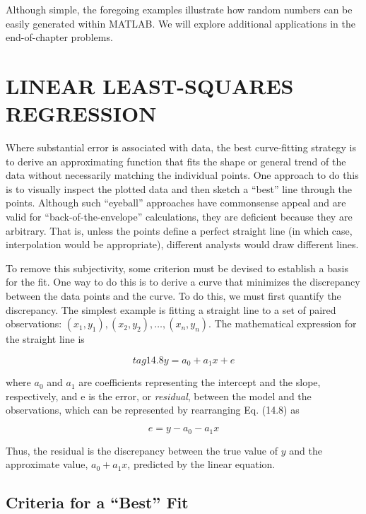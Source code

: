 \documentclass[../main.tex]{subfiles}
\begin{document}
Although simple, the foregoing examples illustrate how random numbers can be easily generated within MATLAB. We will explore additional applications in the end-of-chapter problems.

\label{cha:cha_P_14_3}
\section{LINEAR LEAST-SQUARES REGRESSION}

\noindent Where substantial error is associated with data, the best curve-fitting strategy is to derive
an approximating function that fits the shape or general trend of the data without necessarily matching the individual points. One approach to do this is to visually inspect the
plotted data and then sketch a ``best'' line through the points. Although such ``eyeball''
approaches have commonsense appeal and are valid for ``back-of-the-envelope'' calculations, they are deficient because they are arbitrary. That is, unless the points define a perfect
straight line (in which case, interpolation would be appropriate), different analysts would
draw different lines.

To remove this subjectivity, some criterion must be devised to establish a basis for the
fit. One way to do this is to derive a curve that minimizes the discrepancy between the data
points and the curve. To do this, we must first quantify the discrepancy. The simplest example is fitting a straight line to a set of paired observations: $(x_1 , y_1 ), (x_2 , y_2 ), \dots , (x_n , y_n )$.
The mathematical expression for the straight line is

\begin{equation}
	tag{14.8}
	y = a_0 + a_1 x +e
\end{equation}

where $a_0$ and $a_1$ are coefficients representing the intercept and the slope, respectively, and
e is the error, or \textit{residual}, between the model and the observations, which can be represented by rearranging Eq. (14.8) as

\begin{equation}
	\tag{14.9}
	e = y - a_0 - a_1 x
\end{equation}

\noindent Thus, the residual is the discrepancy between the true value of $y$ and the approximate value,
$a_0 + a_1 x$, predicted by the linear equation.

\label{cha:cha_P_14_3_1}
\subsection{Criteria for a ``Best'' Fit}
\end{document}
